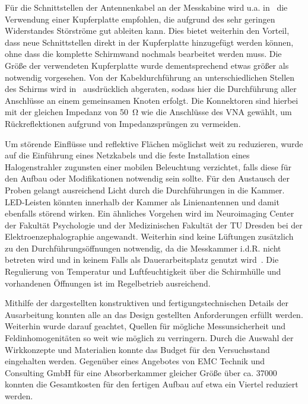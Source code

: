 Für die Schnittstellen der Antennenkabel an der Messkabine wird u.a. in~\cite{EM_Schirmung, EMV} die Verwendung einer Kupferplatte empfohlen, die aufgrund des sehr geringen Widerstandes Störströme gut ableiten kann. Dies bietet weiterhin den Vorteil, dass neue Schnittstellen direkt in der Kupferplatte hinzugefügt werden können, ohne dass die komplette Schirmwand nochmals bearbeitet werden muss. Die Größe der verwendeten Kupferplatte wurde dementsprechend etwas größer als notwendig vorgesehen. Von der Kabeldurchführung an unterschiedlichen Stellen des Schirms wird in~\cite{EM_Schirmung, EMV, Design_of_shielded_enclosures} ausdrücklich abgeraten, sodass hier die Durchführung aller Anschlüsse an einem gemeinsamen Knoten erfolgt. Die Konnektoren sind hierbei mit der gleichen Impedanz von \SI{50}{\ohm} wie die Anschlüsse des \ac{VNA} gewählt, um Rückreflektionen aufgrund von Impedanzsprüngen zu vermeiden. 
\par
\vspace{\linespace}
Um störende Einflüsse und reflektive Flächen möglichst weit zu reduzieren, wurde auf die Einführung eines Netzkabels und die feste Installation eines Halogenstrahler zugunsten einer mobilen Beleuchtung verzichtet, falls diese für den Aufbau oder Modifikationen notwendig sein sollte. Für den Austausch der Proben gelangt ausreichend Licht durch die Durchführungen in die Kammer. LED-Leisten könnten innerhalb der Kammer als Linienantennen und damit ebenfalls störend wirken. Ein ähnliches Vorgehen wird im Neuroimaging Center der Fakultät Psychologie und der Medizinischen Fakultät der TU Dresden bei der Elektroenzephalographie angewandt. Weiterhin sind keine Lüftungen zusätzlich zu den Durchführungsöffnungen notwendig, da die Messkammer i.d.R. nicht betreten wird und in keinem Falls als Dauerarbeitsplatz genutzt wird~\cite{EM_Schirmung}. Die Regulierung von Temperatur und Luftfeuchtigkeit über die Schirmhülle und vorhandenen Öffnungen ist im Regelbetrieb ausreichend.  

    

Mithilfe der dargestellten konstruktiven und fertigungstechnischen Details der Ausarbeitung konnten alle an das Design gestellten Anforderungen erfüllt werden. Weiterhin wurde darauf geachtet, Quellen für mögliche Messunsicherheit und Feldinhomogenitäten so weit wie möglich zu verringern. Durch die Auswahl der Wirkkonzepte und Materialien konnte das Budget für den Versuchsstand eingehalten werden. Gegenüber eines Angebotes von EMC Technik und Consulting GmbH für eine Absorberkammer gleicher Größe über ca. \SI{37000}{\text{\euro}} konnten die Gesamtkosten für den fertigen Aufbau auf etwa ein Viertel reduziert werden. 

